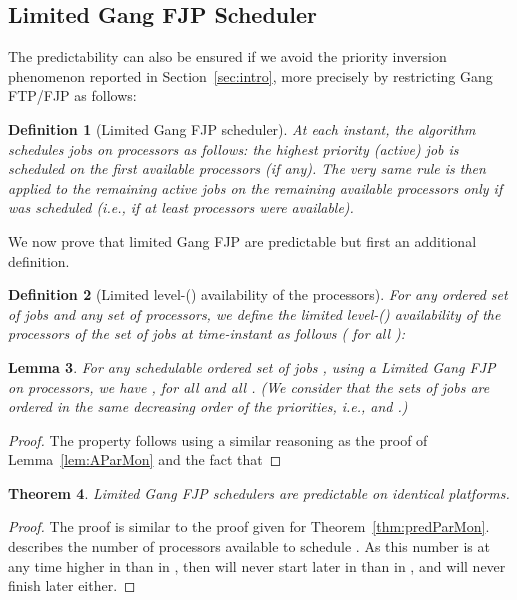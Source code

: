 \documentclass[a4paper]{article}
\newtheorem{theorem}{Theorem}
\newtheorem{definition}[theorem]{Definition}
\newtheorem{lemma}[theorem]{Lemma}
\begin{document}
\subsection{Limited Gang FJP Scheduler}

The predictability can also be ensured if we avoid the priority inversion phenomenon reported in Section~\ref{sec:intro}, more precisely by restricting Gang FTP/FJP as follows:

\begin{definition}[Limited Gang FJP scheduler] At each instant, the algorithm schedules jobs on processors as follows: the highest priority (active) job  is scheduled on the first  available processors (if any). The very same rule is then applied to the remaining active jobs on the remaining available processors \emph{only if}  was scheduled (i.e., if at least  processors were available).
\end{definition}

We now prove that limited Gang FJP are predictable but first an additional definition.

\begin{definition}[Limited level-() availability of the processors]
For any ordered set of  jobs  and any set of  processors, we define the \emph{limited level-() availability of the processors}  of the set of jobs  at time-instant  as follows ( for all ):

\end{definition}

\begin{lemma}\label{lem:ALimGang} 
For any schedulable ordered set of jobs , using a Limited Gang FJP on   processors, we have , for all  and all . (We consider that the sets of jobs are ordered in the same decreasing order of the priorities, i.e.,  and .)
\end{lemma}
\begin{proof}
The property follows using a similar reasoning as the proof of Lemma~\ref{lem:AParMon} and the fact that 
\end{proof}

\begin{theorem}\label{thm:predLimited}
Limited Gang FJP schedulers are predictable on identical platforms.
\end{theorem}

\begin{proof}
The proof is similar to the proof given for Theorem~\ref{thm:predParMon}.  describes the number of processors available to schedule . As this number is at any time higher in  than in , then  will never start later in   than in , and will never finish later either.
\end{proof}
\end{document}
